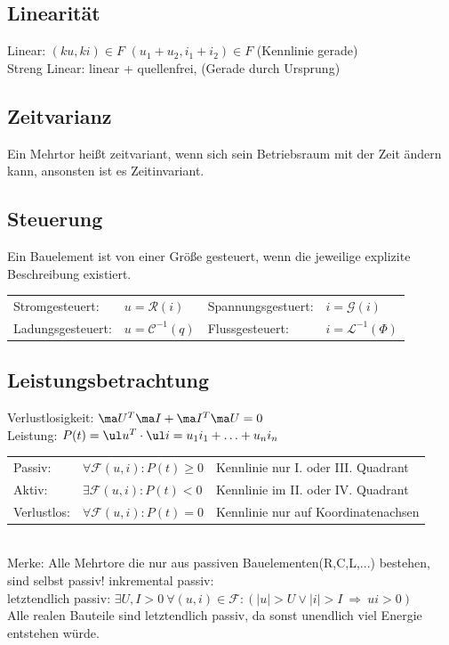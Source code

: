 \documentclass[fs, footer]{latex4ei}
\begin{document}
\begin{multicols*}{4}
    \subsection{Linearität}
    Linear: $(ku, ki) \in F$ \quad $(u_1 + u_2, i_1 + i_2) \in F$ (Kennlinie gerade) \\
    Streng Linear: linear + quellenfrei, (Gerade durch Ursprung)\\

    \subsection{Zeitvarianz}
    Ein Mehrtor heißt zeitvariant, wenn sich sein Betriebsraum mit der Zeit ändern kann, ansonsten
    ist es Zeitinvariant.

    \subsection{Steuerung}
    Ein Bauelement ist von einer Größe gesteuert, wenn die jeweilige explizite Beschreibung existiert.\\
    \begin{tabular*}{\columnwidth}{@{\extracolsep\fill}llll@{}}
        Stromgesteuert: & $u=\mathcal R(i)$ & Spannungsgestuert: & $i=\mathcal G(i)$\\
        Ladungsgesteuert: & $u=\mathcal C^{-1}(q)$ & Flussgesteuert: & $i=\mathcal L^{-1}(\Phi)$
    \end{tabular*}

    \subsection{Leistungsbetrachtung}
    Verlustlosigkeit: $\ma U^T\ma I + \ma I^T \ma U = 0$\\
    Leistung: $P(t)=\ul u^T \cdot \ul i=u_1 i_1 + \dotsc + u_n i_n$ \\
    \begin{tabular*}{\columnwidth}{@{\extracolsep\fill}lll@{}}
        Passiv: & $\forall \mathcal F(u,i): P(t)\ge 0$ & Kennlinie nur I. oder III. Quadrant\\
        Aktiv: & $\exists \mathcal F(u,i): P(t)<0$ & Kennlinie im II. oder IV. Quadrant\\
        Verlustlos: & $\forall \mathcal F(u,i): P(t)=0$ & Kennlinie nur auf Koordinatenachsen\\
    \end{tabular*}\\
    Merke: Alle Mehrtore die nur aus passiven Bauelementen(R,C,L,...) bestehen, sind selbst passiv!
    inkremental passiv:\\
    letztendlich passiv: $\exists U,I>0 \ \forall (u,i) \in \mathcal F : (|u| > U \lor |i| > I \ \Rightarrow \ ui > 0)$\\
    Alle realen Bauteile sind letztendlich passiv, da sonst unendlich viel Energie entstehen würde.\\



\end{multicols*}
\end{document}

